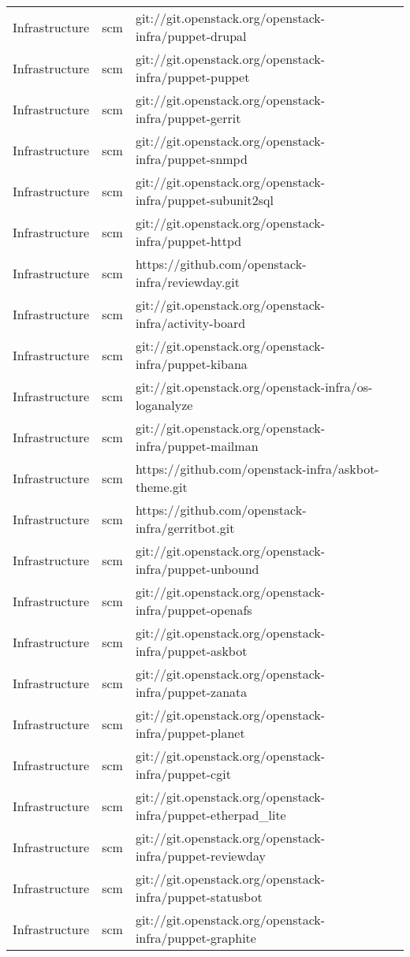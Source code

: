 \begin{center}
\begin{longtable}{|p{4cm}|p{1cm}|p{10cm}|}
Infrastructure&scm&git://git.openstack.org/openstack-infra/puppet-drupal\\ 
Infrastructure&scm&git://git.openstack.org/openstack-infra/puppet-puppet\\ 
Infrastructure&scm&git://git.openstack.org/openstack-infra/puppet-gerrit\\ 
Infrastructure&scm&git://git.openstack.org/openstack-infra/puppet-snmpd\\ 
Infrastructure&scm&git://git.openstack.org/openstack-infra/puppet-subunit2sql\\ 
Infrastructure&scm&git://git.openstack.org/openstack-infra/puppet-httpd\\ 
Infrastructure&scm&https://github.com/openstack-infra/reviewday.git\\ 
Infrastructure&scm&git://git.openstack.org/openstack-infra/activity-board\\ 
Infrastructure&scm&git://git.openstack.org/openstack-infra/puppet-kibana\\ 
Infrastructure&scm&git://git.openstack.org/openstack-infra/os-loganalyze\\ 
Infrastructure&scm&git://git.openstack.org/openstack-infra/puppet-mailman\\ 
Infrastructure&scm&https://github.com/openstack-infra/askbot-theme.git\\ 
Infrastructure&scm&https://github.com/openstack-infra/gerritbot.git\\ 
Infrastructure&scm&git://git.openstack.org/openstack-infra/puppet-unbound\\ 
Infrastructure&scm&git://git.openstack.org/openstack-infra/puppet-openafs\\ 
Infrastructure&scm&git://git.openstack.org/openstack-infra/puppet-askbot\\ 
Infrastructure&scm&git://git.openstack.org/openstack-infra/puppet-zanata\\ 
Infrastructure&scm&git://git.openstack.org/openstack-infra/puppet-planet\\ 
Infrastructure&scm&git://git.openstack.org/openstack-infra/puppet-cgit\\ 
Infrastructure&scm&git://git.openstack.org/openstack-infra/puppet-etherpad\_lite\\ 
Infrastructure&scm&git://git.openstack.org/openstack-infra/puppet-reviewday\\ 
Infrastructure&scm&git://git.openstack.org/openstack-infra/puppet-statusbot\\ 
Infrastructure&scm&git://git.openstack.org/openstack-infra/puppet-graphite\\ 

\end{longtable}
\end{center}
